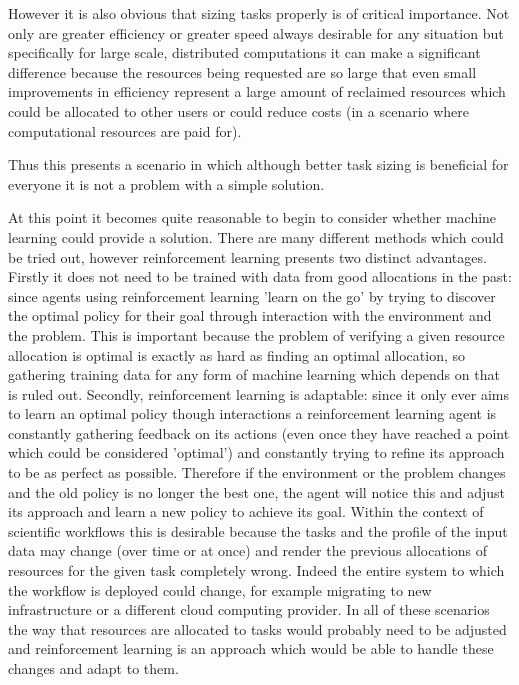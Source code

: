 However it is also obvious that sizing tasks properly is of critical importance. Not only are greater efficiency or greater speed always desirable for any situation but specifically for large scale, distributed computations it can make a significant difference because the resources being requested are so large that even small improvements in efficiency represent a large amount of reclaimed resources which could be allocated to other users or could reduce costs (in a scenario where computational resources are paid for). 

Thus this presents a scenario in which although better task sizing is beneficial for everyone it is not a problem with a simple solution.

At this point it becomes quite reasonable to begin to consider whether machine learning could provide a solution. There are many different methods which could be tried out, however reinforcement learning presents two distinct advantages. Firstly it does not need to be trained with data from good allocations in the past: since agents using reinforcement learning 'learn on the go' by trying to discover the optimal policy for their goal through interaction with the environment and the problem. This is important because the problem of verifying a given resource allocation is optimal is exactly as hard as finding an optimal allocation, so gathering training data for any form of machine learning which depends on that is ruled out. Secondly, reinforcement learning is adaptable: since it only ever aims to learn an optimal policy though interactions a reinforcement learning agent is constantly gathering feedback on its actions (even once they have reached a point which could be considered 'optimal') and constantly trying to refine its approach to be as perfect as possible. Therefore if the environment or the problem changes and the old policy is no longer the best one, the agent will notice this and adjust its approach and learn a new policy to achieve its goal. Within the context of scientific workflows this is desirable because the tasks and the profile of the input data may change (over time or at once) and render the previous allocations of resources for the given task completely wrong. Indeed the entire system to which the workflow is deployed could change, for example migrating to new infrastructure or a different cloud computing provider. In all of these scenarios the way that resources are allocated to tasks would probably need to be adjusted and reinforcement learning is an approach which would be able to handle these changes and adapt to them.

